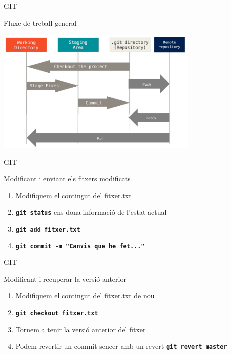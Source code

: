 \documentclass[10pt,xcolor={rgb}]{beamer}
\begin{document}
    \begin{frame}[fragile]{GIT}
      \begin{block}{Fluxe de treball general}

        \centering
        \includegraphics[height=6cm]{git.png}

      \end{block}
    \end{frame}

    \begin{frame}[fragile]{GIT}
      \begin{block}{Modificant i enviant els fitxers modificats}

        \begin{enumerate}
          \item Modifiquem el contingut del fitxer.txt
          \item \texttt{\textbf{git status}} ens dona informació de l'estat actual
          \item \texttt{\textbf{git add fitxer.txt}}
          \item \texttt{\textbf{git commit -m "Canvis que he fet..."}}
        \end{enumerate}

      \end{block}
    \end{frame}

    \begin{frame}[fragile]{GIT}
      \begin{block}{Modificant i recuperar la versió anterior}

        \begin{enumerate}
          \item Modifiquem el contingut del fitxer.txt de nou
          \item \texttt{\textbf{git checkout fitxer.txt}}
          \item Tornem a tenir la versió anterior del fitxer
          \item Podem revertir un commit sencer amb un revert \texttt{\textbf{git revert master}}
        \end{enumerate}

      \end{block}
    \end{frame}
\end{document}
